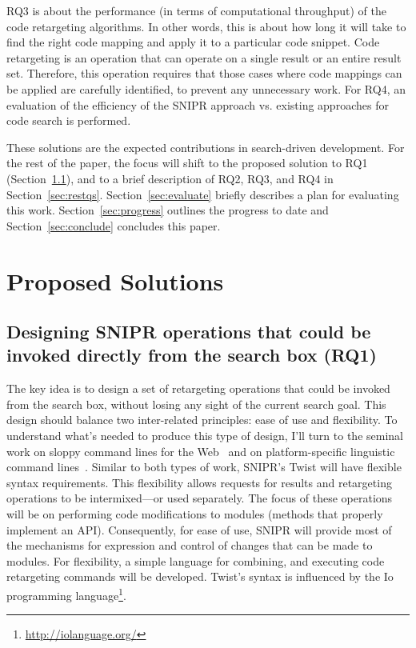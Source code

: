 \documentclass[conference]{IEEEtran}
\begin{document}
RQ3 is about the performance (in terms of computational throughput) of the code retargeting algorithms. In other words, this is about how long it will take to find the right code mapping and apply it to a particular code snippet. Code retargeting is an operation that can operate on a single result or an entire result set. Therefore, this operation requires that those cases where code mappings can be applied are carefully identified, to prevent any unnecessary work. For RQ4, an evaluation of the efficiency of the \uppercase{SnipR} approach vs. existing approaches for code search is performed. 

These solutions are the expected contributions in search-driven development. For the rest of the paper, the focus will shift to the proposed solution to RQ1 (Section~\ref{sec:rq1}), and to a brief description of RQ2, RQ3, and RQ4 in Section~\ref{sec:restqs}. Section~\ref{sec:evaluate} briefly describes a plan for evaluating this work. Section~\ref{sec:progress} outlines the progress to date and Section~\ref{sec:conclude} concludes this paper. 

\section{Proposed Solutions}
\subsection{Designing \uppercase{SnipR} operations that could be invoked directly from the search box (RQ1)}
\label{sec:rq1}
The key idea is to design a set of retargeting operations that could be invoked from the search box, without losing any sight of the current search goal. This design should balance two inter-related principles: ease of use and flexibility. To understand what's needed to produce this type of design, I'll turn to the seminal work on sloppy command lines for the Web~\cite{Little:2007dh, Miller:2008ge} and on platform-specific linguistic command lines~\cite{Raskin:2008wb}. Similar to both types of work, \uppercase{SnipR}'s Twist will have flexible syntax requirements. This flexibility allows requests for results and retargeting operations to be intermixed---or used separately. The focus of these operations will be on performing code modifications to modules (methods that properly implement an API). Consequently, for ease of use, \uppercase{SnipR} will provide most of the mechanisms for expression and control of changes that can be made to modules. For flexibility, a simple language for combining, and executing code retargeting commands will be developed. Twist's syntax is influenced by the Io programming language\footnote{\url{http://iolanguage.org/}}.
\end{document}
